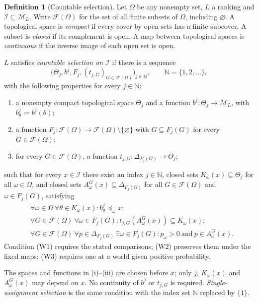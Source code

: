 \documentclass[11pt]{article}
\theoremstyle{definition}
\newtheorem{definition}[theorem]{Definition}
\theoremstyle{remark}
\newcommand{\M}{\mathcal M}
\newcommand{\I}{\mathcal I}
\begin{document}
\begin{definition}[Countable selection]\label{def:selection}\label{def:family}
{\color{red}Let $\Omega$ be any nonempty set,} $L$ a ranking and $\I\subseteq\M_L$. Write $\mathcal F(\Omega)$ for the set of all finite subsets of $\Omega$, including $\varnothing$. A topological space is \emph{compact} if every cover by open sets has a finite subcover. A subset is \emph{closed} if its complement is open. A map between topological spaces is \emph{continuous} if the inverse image of each open set is open.

$L$ satisfies \emph{countable selection on $\I$} if there is a sequence
\[
\bigl(\Theta_j,b^j,F_j,(t_{j,G})_{G\in\mathcal F(\Omega)}\bigr)_{j\in\mathbb N},\qquad \mathbb N=\{1,2,\ldots\},
\]
with the following properties for every $j\in\mathbb N$:
\begin{enumerate}[label=(\roman*)]
\item a nonempty compact topological space $\Theta_j$ and a function $b^j:\Theta_j\to\M_L$, with $b^j_\theta\coloneqq b^j(\theta)$;
\item a function $F_j:\mathcal F(\Omega)\to\mathcal F(\Omega)\setminus\{\varnothing\}$ with $G\subseteq F_j(G)$ for every $G\in\mathcal F(\Omega)$;
\item for every $G\in\mathcal F(\Omega)$, a function $t_{j,G}:\Delta_{F_j(G)}\to\Theta_j$;
\end{enumerate}
such that for every $x\in\I$ there exist an index $j\in\mathbb N$, closed sets $K_\omega(x)\subseteq\Theta_j$ for all $\omega\in\Omega$, and closed sets $A^G_\omega(x)\subseteq\Delta_{F_j(G)}$ for all $G\in\mathcal F(\Omega)$ and $\omega\in F_j(G)$, satisfying
\begin{align}
&\forall\omega\in\Omega\ \forall\theta\in K_\omega(x):
 b^j_\theta\preceq_\omega x;\tag{W1}\label{eq:comparison}\\
&\forall G\in\mathcal F(\Omega)\ \forall\omega\in F_j(G):
 t_{j,G}(A^G_\omega(x))\subseteq K_\omega(x);\tag{W2}\label{eq:compatibility}\\
&\forall G\in\mathcal F(\Omega)\ \forall p\in\Delta_{F_j(G)}\
 \exists\omega\in F_j(G):
 p_\omega>0\ \text{and}\ p\in A^G_\omega(x).\tag{W3}\label{eq:support}
\end{align}
Condition (W1) requires the stated comparisons; (W2) preserves them under the fixed maps; (W3) requires one at a world given positive probability.

The spaces and functions in (i)--(iii) are chosen before $x$; only $j$, $K_\omega(x)$ and $A^G_\omega(x)$ may depend on $x$. No continuity of $b^j$ or $t_{j,G}$ is required. \emph{Single-assignment selection} is the same condition with the index set $\mathbb N$ replaced by $\{1\}$.
\end{definition}
\end{document}
